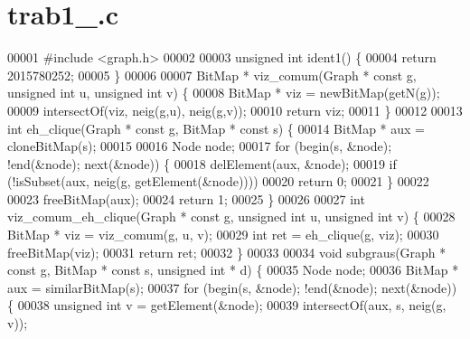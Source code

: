 \section{trab1\+\_.\+c}
\label{trab1__2015780252_8c_source}

\begin{DoxyCode}
00001 \textcolor{preprocessor}{#include <graph.h>}
00002 
00003 \textcolor{keywordtype}{unsigned} \textcolor{keywordtype}{int} ident1() \{
00004         \textcolor{keywordflow}{return} 2015780252;
00005 \}
00006 
00007 BitMap * viz_comum(Graph * \textcolor{keyword}{const} g, \textcolor{keywordtype}{unsigned} \textcolor{keywordtype}{int} u, \textcolor{keywordtype}{unsigned} \textcolor{keywordtype}{int} v) \{
00008         BitMap * viz = newBitMap(getN(g));
00009         intersectOf(viz, neig(g,u), neig(g,v));
00010         \textcolor{keywordflow}{return} viz;
00011 \}
00012 
00013 \textcolor{keywordtype}{int} eh_clique(Graph * \textcolor{keyword}{const} g, BitMap * \textcolor{keyword}{const} s) \{
00014         BitMap * aux = cloneBitMap(s);
00015 
00016         Node node;
00017         \textcolor{keywordflow}{for} (begin(s, &node); !end(&node); next(&node)) \{
00018                 delElement(aux, &node);
00019                 \textcolor{keywordflow}{if} (!isSubset(aux, neig(g, getElement(&node))))
00020                         \textcolor{keywordflow}{return} 0;
00021         \}
00022 
00023         freeBitMap(aux);
00024         \textcolor{keywordflow}{return} 1;
00025 \}
00026 
00027 \textcolor{keywordtype}{int} viz_comum_eh_clique(Graph * \textcolor{keyword}{const} g, \textcolor{keywordtype}{unsigned} \textcolor{keywordtype}{int} u, \textcolor{keywordtype}{unsigned} \textcolor{keywordtype}{int} v) \{
00028         BitMap * viz = viz_comum(g, u, v);
00029         \textcolor{keywordtype}{int} ret = eh_clique(g, viz);
00030         freeBitMap(viz);
00031         \textcolor{keywordflow}{return} ret;
00032 \}
00033 
00034 \textcolor{keywordtype}{void} subgraus(Graph * \textcolor{keyword}{const} g, BitMap * \textcolor{keyword}{const} s, \textcolor{keywordtype}{unsigned} \textcolor{keywordtype}{int} * d) \{
00035         Node node;
00036         BitMap * aux = similarBitMap(s);
00037         \textcolor{keywordflow}{for} (begin(s, &node); !end(&node); next(&node)) \{
00038                 \textcolor{keywordtype}{unsigned} \textcolor{keywordtype}{int} v = getElement(&node);
00039                 intersectOf(aux, s, neig(g, v));

\end{DoxyCode}
